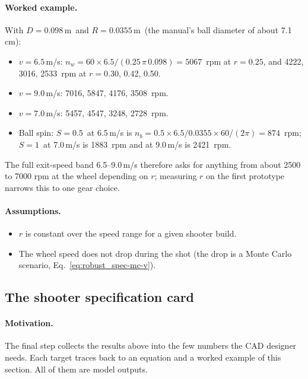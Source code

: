 \paragraph{Worked example.}
With $D=0.098$\,\unit{m}\userval\ and $R=0.0355$\,\unit{m}\confirmed\ (the manual's ball diameter of
about 7.1\,\unit{cm}):
\begin{itemize}
  \item $v=6.5$\,\unit{m/s}\predicted:
    $n_w = 60\times6.5/(0.25\,\pi\,0.098) = 5067$\derived\ rpm at $r=0.25$\assumed, and
    4222\derived, 3016\derived, 2533\derived\ rpm at $r=0.30$, 0.42, 0.50.
  \item $v=9.0$\,\unit{m/s}\predicted: 7016\derived, 5847\derived, 4176\derived, 3508\derived\ rpm.
  \item $v=7.0$\,\unit{m/s}\predicted: 5457\derived, 4547\derived, 3248\derived, 2728\derived\ rpm.
  \item Ball spin: $S=0.5$\assumed\ at 6.5\,\unit{m/s} is
    $n_b=0.5\times6.5/0.0355\times60/(2\pi)=874$\derived\ rpm; $S=1$\assumed\ at 7.0\,\unit{m/s} is
    1883\derived\ rpm and at 9.0\,\unit{m/s} is 2421\derived\ rpm.
\end{itemize}
The full exit-speed band 6.5--9.0\,\unit{m/s} therefore asks for anything from about 2500 to 7000 rpm
at the wheel depending on $r$; measuring $r$ on the first prototype narrows this to one gear choice.

\paragraph{Assumptions.}
\begin{itemize}
  \item $r$ is constant over the speed range for a given shooter build.
  \item The wheel speed does not drop during the shot (the drop is a Monte Carlo scenario, Eq.~\eqref{eq:robust_spec-mc-v}).
\end{itemize}

\subsection{The shooter specification card}
\label{sec:robust_spec-card}

\paragraph{Motivation.}
The final step collects the results above into the few numbers the CAD designer needs.
Each target traces back to an equation and a worked example of this section.
All of them are model outputs.

